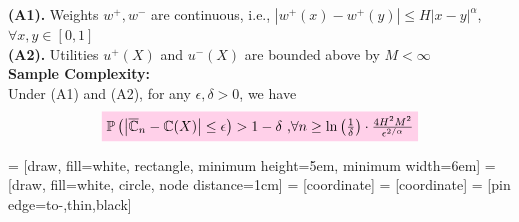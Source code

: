 \documentclass{beamer}
\begin{document}
\begin{frame}{	}

\vspace{3ex}

\begin{small}

{\textbf{(A1).}  Weights $w^+, w^-$ are \holder continuous, i.e., $| w^+(x) - w^+(y) | \leq H | x-y |^{\alpha}$, $\forall x,y \in [0,1]$}\\[2ex]
{\textbf{(A2).}  Utilities $u^+(X)$ and $u^-(X)$ are bounded above by $M<\infty$}\\[4ex]

{\color{blue}\textbf{Sample Complexity:}}\\[1ex]
Under (A1) and (A2), for any $\epsilon, \delta >0$, we have
\begin{align*}
\tikz[baseline]{
            \node[fill=pink!20,anchor=base] (t1)
            {
$\Prob{\left |\overline \C_n- \C(X) \right| \leq  \epsilon } >1- \delta\text{     ,} \forall n \geq \ln\left(\frac{1}{\delta}\right)\cdot 
\frac{4H^2 M^2}{\epsilon^{2/\alpha}}$};}
\end{align*}

\vspace{3ex}
\pause

 = [draw, fill=white, rectangle,
   minimum height=5em, minimum width=6em]
 = [draw, fill=white, circle, node distance=1cm]
 = [coordinate]
 = [coordinate]
 = [pin edge={to-,thin,black}]

\begin{columns}
\begin{column}{0.5\textwidth}


\end{column}
\end{columns}
\end{small}
\end{frame}
\end{document}
